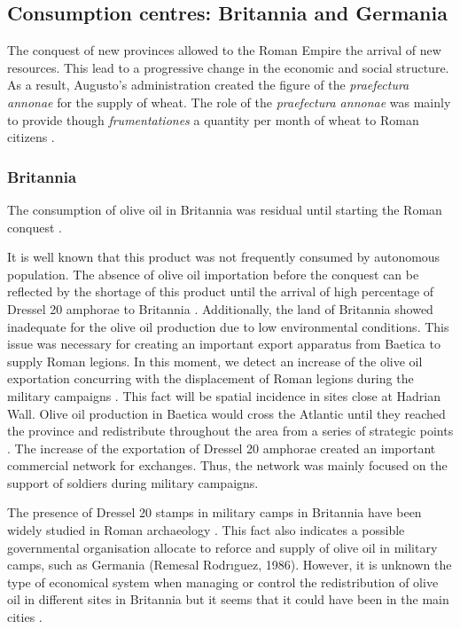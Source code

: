 \documentclass[review]{elsarticle}
\begin{document}
\subsection{Consumption centres: Britannia and Germania}

The conquest of new provinces allowed to the Roman Empire the arrival of new resources. This lead to a progressive change in the economic and social structure. As a result, Augusto's administration created the figure of the \textit{praefectura annonae} for the supply of wheat. The role of the \textit{praefectura annonae} was mainly to provide though \textit{frumentationes} a quantity per month of wheat to Roman citizens \citep{remesal_annona_1986,remesal_concierto}. 

\subsubsection{Britannia}

The consumption of olive oil in Britannia was residual until starting the Roman conquest \citep{funari_corpus_1996,
carreras_abastecimiento_2003}.

It is well known that this product was not frequently consumed by autonomous population. The absence of olive oil importation before the conquest can be reflected by the shortage of this product until the arrival of high percentage of Dressel 20 amphorae to Britannia \citep[ 1]{carreras_britannia_1998}. Additionally, the land of Britannia showed inadequate for the olive oil production due to low environmental conditions. This issue was necessary for creating an important export apparatus from Baetica to supply Roman legions.
In this moment, we detect an increase of the olive oil exportation concurring with the displacement of Roman legions during the military campaigns \citep[161]{monfort_britanniaen_1998}. This fact will be spatial incidence in sites close at Hadrian Wall.  
Olive oil production in Baetica would cross the Atlantic until they reached the province and redistribute throughout the area from a series of strategic points \citep{carreras_atlantic_2012}. The increase of the exportation of Dressel 20 amphorae created an important commercial network for exchanges. Thus, the network was mainly focused on the support of soldiers during military campaigns. 

The presence of Dressel 20 stamps in military camps in Britannia have been widely studied in Roman archaeology \citep{carreras_britannia_1998}. This fact also indicates a possible governmental organisation allocate to reforce and supply of olive oil in military camps, such as Germania (Remesal Rodrıguez, 1986). However, it is unknown the type of economical system when managing or control the redistribution of olive oil in different sites in Britannia but it seems that it could have been in the main cities \citep[45]{funari_economic_2005}.
\end{document}
